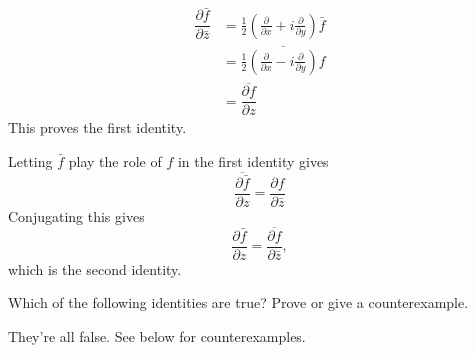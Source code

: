 \documentclass[12pt]{exam}
\DeclareMathOperator{\length}{length}
\begin{document}
\begin{questions}
\begin{solution}
    \begin{align*}
        \dfrac{\partial \bar f}{\partial \bar z} &=
        \frac12\left(\frac{\partial}{\partial x} + i\frac{\partial}{\partial y}\right)\bar f\\
        &= \overline{\frac12\left(\frac{\partial}{\partial x} - i\frac{\partial}{\partial y}\right)f}\\
        &= \overline{\dfrac{\partial f}{\partial z}}
    \end{align*}
    This proves the first identity.

    Letting $\bar f$ play the role of $f$ in the first identity gives
    \[
        \overline{\dfrac{\partial \bar f}{\partial z}} = \dfrac{\partial f}{\partial \bar z}
    \]
    Conjugating this gives
    \[
        \dfrac{\partial \bar f}{\partial z} = \overline{\dfrac{\partial f}{\partial \bar z}},
    \]
    which is the second identity.
\end{solution}

\question Which of the following identities are true? Prove or give a counterexample.
\begin{solution}
    They're all false.  See below for counterexamples.
\end{solution}
\end{questions}
\end{document}
